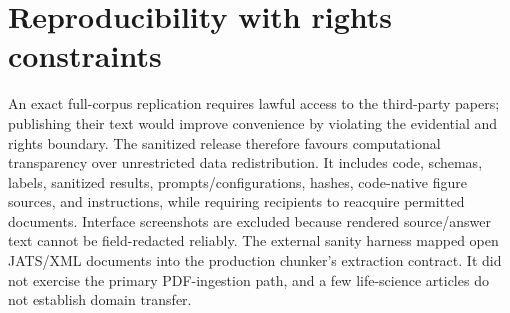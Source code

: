 \section{Reproducibility with rights constraints}

An exact full-corpus replication requires lawful access to the third-party papers; publishing their text would improve convenience by violating the evidential and rights boundary. The sanitized release therefore favours computational transparency over unrestricted data redistribution. It includes code, schemas, labels, sanitized results, prompts/configurations, hashes, code-native figure sources, and instructions, while requiring recipients to reacquire permitted documents. Interface screenshots are excluded because rendered source/answer text cannot be field-redacted reliably. The external sanity harness mapped open JATS/XML documents into the production chunker's extraction contract. It did not exercise the primary PDF-ingestion path, and a few life-science articles do not establish domain transfer.
